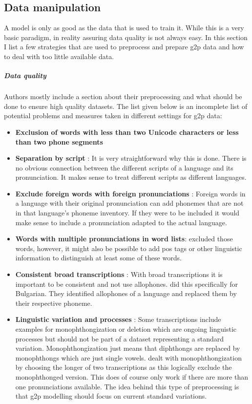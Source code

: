 \subsection{Data manipulation}
A model is only as good as the data that is used to train it. While this is a very basic paradigm, in reality assuring data quality is not always easy. In this section I list a few strategies that are used to preprocess and prepare \ac{g2p} data and how to deal with too little available data. 

\subparagraph{Data quality}
\label{data_qual}
Authors mostly include a section about their preprocessing and what should be done to ensure high quality datasets. The list given below is an incomplete list of potential problems and measures taken in different settings for \ac{g2p} data:

\begin{itemize}
\item \textbf{Exclusion of words with less than two Unicode characters or less than two phone segments} \citep{Ashby-Bartley.2021} 
\item \textbf{Separation by script} \citep{Ashby-Bartley.2021}: It is very straightforward why this is done. There is no obvious connection between the different scripts of a language and its pronunciation. It makes sense to treat different scripts as different languages. 
\item \textbf{Exclude foreign words with foreign pronunciations} \citep{Ashby-Bartley.2021}: Foreign words in a language with their original pronunciation can add phonemes that are not in that language's phoneme inventory. If they were to be included it would make sense to include a pronunciation adapted to the actual language.
\item \textbf{Words with multiple pronunciations in word lists}: \cite{Ashby-Bartley.2021} excluded those words, however, it might also be possible to add \ac{pos} tags or other linguistic information to distinguish at least some of these words.
\item \textbf{Consistent broad transcriptions} \citep{Ashby-Bartley.2021}: With broad transcriptions it is important to be consistent and not use allophones. \cite{Ashby-Bartley.2021} did this specifically for Bulgarian. They identified allophones of a language and replaced them by their respective phoneme.
\item \textbf{Linguistic variation and processes} \citep{Ashby-Bartley.2021}: Some transcriptions include examples for monophthongization or deletion which are ongoing linguistic processes but should not be part of a dataset representing a standard variation. Monophthongization just means that diphthongs are replaced by monophthongs which are just single vowels. \cite{Ashby-Bartley.2021} dealt with monophthongization by choosing the longer of two transcriptions as this logically exclude the monophthonged version. This does of course only work if there are more than one pronunciations available. The idea behind this type of preprocessing is that \ac{g2p} modelling should focus on current standard variations.

\end{itemize}
